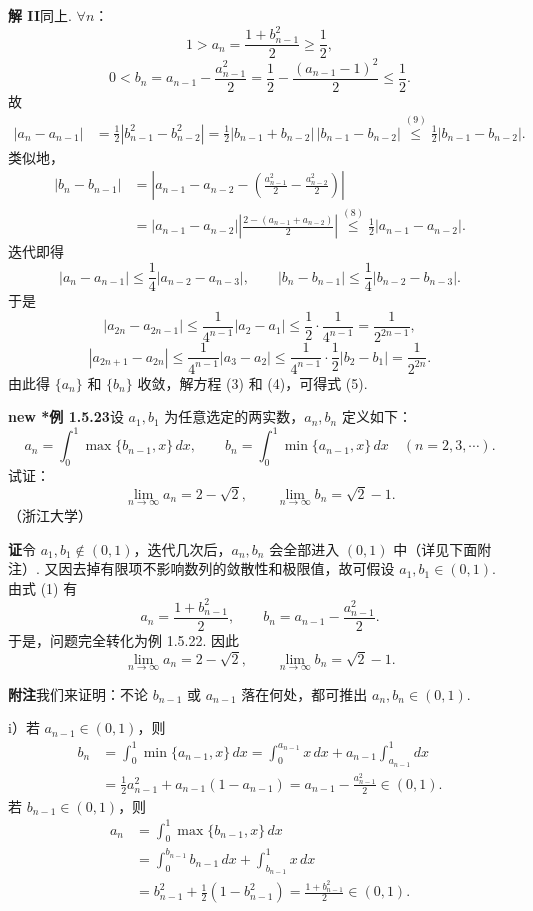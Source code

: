 \documentclass[UTF8,12pt,a4paper,fontset=fandol]{ctexart}
\begin{document}
\noindent\textbf{解 II}\quad 同上. $\forall n$：
\[
  1>a_n=\frac{1+b_{n-1}^2}{2}\ge \frac12,
\tag{8}
\]
\[
  0<b_n=a_{n-1}-\frac{a_{n-1}^2}{2}
  =\frac12-\frac{(a_{n-1}-1)^2}{2}\le \frac12.
\tag{9}
\]
故
\[
\begin{aligned}
  |a_n-a_{n-1}|
  &=\frac12|b_{n-1}^2-b_{n-2}^2|
   =\frac12|b_{n-1}+b_{n-2}|\,|b_{n-1}-b_{n-2}|
   \stackrel{(9)}{\le}\frac12|b_{n-1}-b_{n-2}|.
\end{aligned}
\]
类似地，
\[
\begin{aligned}
  |b_n-b_{n-1}|
  &=\left|a_{n-1}-a_{n-2}
    -\left(\frac{a_{n-1}^2}{2}-\frac{a_{n-2}^2}{2}\right)\right|\\
  &=|a_{n-1}-a_{n-2}|
    \left|\frac{2-(a_{n-1}+a_{n-2})}{2}\right|
   \stackrel{(8)}{\le}\frac12|a_{n-1}-a_{n-2}|.
\end{aligned}
\]
迭代即得
\[
  |a_n-a_{n-1}|\le \frac14|a_{n-2}-a_{n-3}|,\qquad
  |b_n-b_{n-1}|\le \frac14|b_{n-2}-b_{n-3}|.
\]
于是
\[
  |a_{2n}-a_{2n-1}|
  \le \frac1{4^{n-1}}|a_2-a_1|
  \le \frac12\cdot \frac1{4^{n-1}}
  =\frac1{2^{2n-1}},
\]
\[
  |a_{2n+1}-a_{2n}|
  \le \frac1{4^{n-1}}|a_3-a_2|
  \le \frac1{4^{n-1}}\cdot \frac12|b_2-b_1|
  =\frac1{2^{2n}}.
\]
由此得 $\{a_n\}$ 和 $\{b_n\}$ 收敛，解方程 (3) 和 (4)，可得式 (5).

\noindent\textbf{new *例 1.5.23}\quad 设 $a_1,b_1$ 为任意选定的两实数，$a_n,b_n$ 定义如下：
\[
  a_n=\int_0^1 \max\{b_{n-1},x\}\,dx,\qquad
  b_n=\int_0^1 \min\{a_{n-1},x\}\,dx\quad (n=2,3,\cdots).
\tag{1}
\]
试证：
\[
  \lim_{n\to\infty}a_n=2-\sqrt2,\qquad
  \lim_{n\to\infty}b_n=\sqrt2-1.
\]
（浙江大学）

\noindent\textbf{证}\quad 令 $a_1,b_1\notin (0,1)$，迭代几次后，$a_n,b_n$ 会全部进入 $(0,1)$ 中（详见下面附注）. 又因去掉有限项不影响数列的敛散性和极限值，故可假设 $a_1,b_1\in (0,1)$. 由式 (1) 有
\[
  a_n=\frac{1+b_{n-1}^2}{2},\qquad
  b_n=a_{n-1}-\frac{a_{n-1}^2}{2}.
\tag{2}
\]
于是，问题完全转化为例 1.5.22. 因此
\[
  \lim_{n\to\infty}a_n=2-\sqrt2,\qquad
  \lim_{n\to\infty}b_n=\sqrt2-1.
\]

\noindent\textbf{附注}\quad 我们来证明：不论 $b_{n-1}$ 或 $a_{n-1}$ 落在何处，都可推出 $a_n,b_n\in (0,1)$.

i）若 $a_{n-1}\in (0,1)$，则
\[
\begin{aligned}
  b_n
  &=\int_0^1\min\{a_{n-1},x\}\,dx
   =\int_0^{a_{n-1}}x\,dx+a_{n-1}\int_{a_{n-1}}^1 dx\\
  &=\frac12a_{n-1}^2+a_{n-1}(1-a_{n-1})
   =a_{n-1}-\frac{a_{n-1}^2}{2}\in (0,1).
\end{aligned}
\]
若 $b_{n-1}\in (0,1)$，则
\[
\begin{aligned}
  a_n
  &=\int_0^1\max\{b_{n-1},x\}\,dx\\
  &=\int_0^{b_{n-1}}b_{n-1}\,dx+\int_{b_{n-1}}^1x\,dx\\
  &=b_{n-1}^2+\frac12(1-b_{n-1}^2)
   =\frac{1+b_{n-1}^2}{2}\in (0,1).
\end{aligned}
\]
\end{document}
